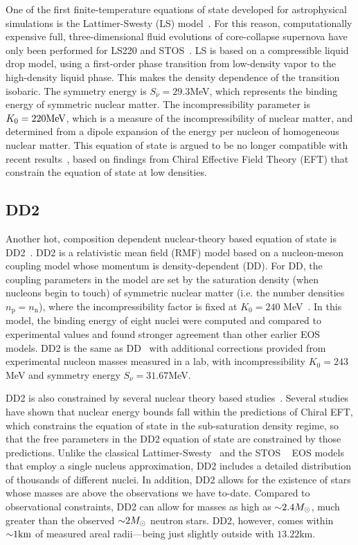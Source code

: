 One of the first finite-temperature equations of state developed for astrophysical simulations is the Lattimer-Swesty (LS) model~\cite{Lattimer:1991nc}.  
For this reason, computationally expensive full, three-dimensional fluid evolutions of core-collapse supernova have only been performed for LS220 and STOS~\cite{Marek2009}.
LS is based on a compressible liquid drop model, using a first-order phase transition from low-density vapor to the high-density liquid phase.  
This makes the density dependence of the transition isobaric.  
The symmetry energy is $S_\nu = 29.3$MeV, which represents the binding energy of symmetric nuclear matter.
The incompressibility parameter is $K_0 = 220 {\rm MeV}$, which is a measure of the incompressibility of nuclear matter, and determined from a dipole expansion of the energy per nucleon of homogeneous nuclear matter.
This equation of state is argued to be no longer compatible with recent results~\cite{Fischer2014}, based on findings from Chiral Effective Field Theory (EFT) that constrain the equation of state at low densities.

\subsection{DD2}
\label{sec:dd2}

Another hot, composition dependent nuclear-theory based equation of state is DD2~\cite{typel2010composition}.  DD2 is a relativistic mean field (RMF) model based on a nucleon-meson coupling model whose momentum is density-dependent (DD).  
For DD, the coupling parameters in the model are set by the saturation density (when nucleons begin to touch) of symmetric nuclear matter (i.e. the number densities $n_\textrm{p} = n_\textrm{n}$), where the incompressibility factor is fixed at $K_0 = 240$ MeV~\cite{typel2005relativistic}.
In this model, the binding energy of eight nuclei were computed and compared to experimental values and found stronger agreement than other earlier EOS models.
DD2 is the same as DD~\cite{typel2005relativistic} with additional corrections provided from experimental nucleon masses measured in a lab, with incompressibility $K_0 = 243$MeV and symmetry energy $S_\nu=31.67$MeV.

DD2 is also constrained by several nuclear theory based studies~\cite{hempel2012new}.
Several studies have shown that nuclear energy bounds fall within the predictions of Chiral EFT, which constrains the equation of state in the sub-saturation density regime, so that the free parameters in the DD2 equation of state are constrained by those predictions. 
Unlike the classical Lattimer-Swesty~\cite{Lattimer:1991nc} and the STOS ~\cite{Shen:1998gq} EOS models that employ a single nucleus approximation, DD2 includes a detailed distribution of thousands of different nuclei.
In addition, DD2 allows for the existence of stars whose masses are above the observations we have to-date.
Compared to observational constraints, DD2 can allow for masses as high as $\mathord{\sim} 2.4 M_\odot$, much greater than the observed $\mathord{\sim} 2 M_\odot$ neutron stars.
DD2, however, comes within $\mathord{\sim} 1 \textrm{km}$ of measured areal radii---being just slightly outside with $13.22 \textrm{km}$.

